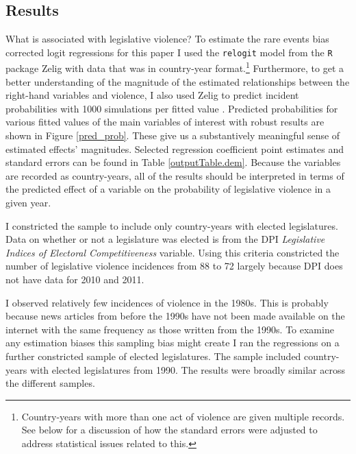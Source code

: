 \documentclass[a4paper]{article}\usepackage{graphicx, color}
\begin{document}


\subsection{Results}

What is associated with legislative violence? To estimate the rare events bias corrected logit regressions for this paper I used the {\tt{relogit}} model from the {\tt{R}} package Zelig \citep{IMAIKingZelig2008} with data that was in country-year format.\footnote{Country-years with more than one act of violence are given multiple records. See below for a discussion of how the standard errors were adjusted to address statistical issues related to this.} Furthermore, to get a better understanding of the magnitude of the estimated relationships between the right-hand variables and violence, I also used Zelig to predict incident probabilities with 1000 simulations per fitted value \citep[see][]{King2002}. Predicted probabilities for various fitted values of the main variables of interest with robust results are shown in Figure \ref{pred_prob}. These give us a substantively meaningful sense of estimated effects' magnitudes. Selected regression coefficient point estimates and standard errors can be found in Table \ref{outputTable.dem}. Because the variables are recorded as country-years, all of the results should be interpreted in terms of the predicted effect of a variable on the probability of legislative violence in a given year.

I constricted the sample to include only country-years with elected legislatures. Data on whether or not a legislature was elected is from the DPI {\emph{Legislative Indices of Electoral Competitiveness}} variable. Using this criteria constricted the number of legislative violence incidences from 88 to 72 largely because DPI does not have data for 2010 and 2011.

I observed relatively few incidences of violence in the 1980s. This is probably because news articles from before the 1990s have not been made available on the internet with the same frequency as those written from the 1990s. To examine any estimation biases this sampling bias might create I ran the regressions on a further constricted sample of elected legislatures. The sample included country-years with elected legislatures from 1990. The results were broadly similar across the different samples. 
\end{document}
